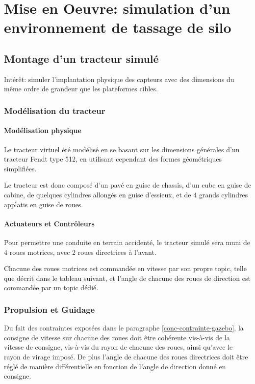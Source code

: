 \documentclass[12pt,a4paper]{report}
\begin{document}
		
	\section{Mise en Oeuvre: simulation d'un environnement de tassage de silo}
		\subsection{Montage d'un tracteur simulé}
		Intérêt: simuler l'implantation physique des capteurs avec des dimensions du même ordre de grandeur que les plateformes cibles.
		
		\subsubsection{Modélisation du tracteur}
			\paragraph{Modélisation physique}
			Le tracteur virtuel été modélisé en se basant sur les dimensions générales d'un tracteur Fendt type 512, en utilisant cependant des formes géométriques simplifiées.
			\newline
			
			Le tracteur est donc composé d'un pavé en guise de chassis, d'un cube en guise de cabine, de quelques cylindres allongés en guise d'essieux, et de 4 grands cylindres applatis en guise de roues.
			
			
			\paragraph{Actuateurs et Contrôleurs}
			
			Pour permettre une conduite en terrain accidenté, le tracteur simulé sera muni de 4 roues motrices, avec 2 roues directrices à l'avant.
			
			\para Chacune des roues motrices est commandée en vitesse par son propre topic, telle que décrit dans le tableau suivant, et l'angle de chacune des roues de direction est commandée par un topic dédié.
			
		\subsubsection{Propulsion et Guidage}
		
			Du fait des contraintes exposées dans le paragraphe \ref{conc-contrainte-gazebo}, la consigne de vitesse sur chacune des roues doit être cohérente vis-à-vis de la vitesse de consigne, vis-à-vis du rayon de chacune des roues, ainsi qu'avec le rayon de virage imposé. De plus l'angle de chacune des roues directrices doit être réglé de manière différentielle en fonction de l'angle de direction donné en consigne.
			
\end{document}
